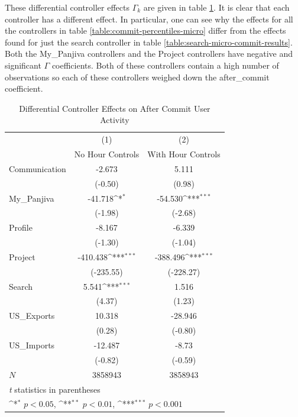 \documentclass[10pt]{article}
\begin{document}
These differential controller effects $\Gamma_k$ are given in table \ref{table:gamma-effects}. It is clear that each controller has a different effect. In particular, one can see why the effects for all the controllers in table \ref{table:commit-percentiles-micro} differ from the effects found for just the search controller in table \ref{table:search-micro-commit-results}. Both the My\_Panjiva controllers and the Project controllers have negative and significant $\Gamma$ coefficients. Both of these controllers contain a high number of observations %
so each of these controllers weighed down the after\_commit coefficient. 

\begin{table}[h!]
\centering
\caption{Differential Controller Effects on After Commit User Activity}
{
    \def\sym#1{\ifmmode^{#1}\else\(^{#1}\)\fi}
    \begin{tabular}{l*{2}{c}}
    \hline\hline
        &\multicolumn{1}{c}{(1)}&\multicolumn{1}{c}{(2)}\\
        &\multicolumn{1}{c}{No Hour Controls}&\multicolumn{1}{c}{With Hour Controls}\\
        \hline
        Communication & -2.673 & 5.111 \\
        & (-0.50) & (0.98) \\
        [1em]
        My\_Panjiva & -41.718\sym{*} & -54.530\sym{***} \\
        & (-1.98) & (-2.68) \\
        [1em]
        Profile & -8.167 & -6.339 \\
        & (-1.30) & (-1.04) \\
        [1em]
        Project & -410.438\sym{***} & -388.496\sym{***} \\
        & (-235.55) & (-228.27) \\
        [1em]
        Search & 5.541\sym{***} & 1.516 \\
        & (4.37) & (1.23) \\
        [1em]
        US\_Exports & 10.318 & -28.946 \\
        & (0.28) & (-0.80) \\
        [1em]
        US\_Imports & -12.487 & -8.73 \\
        & (-0.82) & (-0.59)\\
        \hline
        \(N\)       & 3858943  & 3858943   \\
        \hline \hline
        \multicolumn{3}{l}{\footnotesize \textit{t} statistics in parentheses}\\
        \multicolumn{3}{l}{\footnotesize \sym{*} \(p<0.05\), \sym{**} \(p<0.01\), \sym{***} \(p<0.001\)}\\
    \end{tabular}
}
\label{table:gamma-effects}
\end{table}
\end{document}
